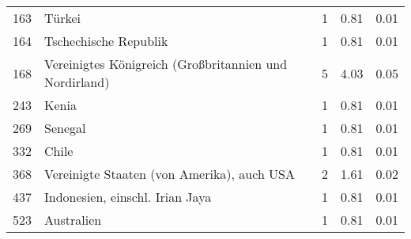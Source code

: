 \begin{longtable}{lXrrr}
        163 & \multicolumn{1}{X}{Türkei} & %
          \num{1} &
          \num[round-mode=places,round-precision=2]{0,81} &
          \num[round-mode=places,round-precision=2]{0,01} \\

        164 & \multicolumn{1}{X}{Tschechische Republik} & %
          \num{1} &
          \num[round-mode=places,round-precision=2]{0,81} &
          \num[round-mode=places,round-precision=2]{0,01} \\

        168 & \multicolumn{1}{X}{Vereinigtes Königreich (Großbritannien und Nordirland)} & %
          \num{5} &
          \num[round-mode=places,round-precision=2]{4,03} &
          \num[round-mode=places,round-precision=2]{0,05} \\

        243 & \multicolumn{1}{X}{Kenia} & %
          \num{1} &
          \num[round-mode=places,round-precision=2]{0,81} &
          \num[round-mode=places,round-precision=2]{0,01} \\

        269 & \multicolumn{1}{X}{Senegal} & %
          \num{1} &
          \num[round-mode=places,round-precision=2]{0,81} &
          \num[round-mode=places,round-precision=2]{0,01} \\

        332 & \multicolumn{1}{X}{Chile} & %
          \num{1} &
          \num[round-mode=places,round-precision=2]{0,81} &
          \num[round-mode=places,round-precision=2]{0,01} \\

        368 & \multicolumn{1}{X}{Vereinigte Staaten (von Amerika), auch USA} & %
          \num{2} &
          \num[round-mode=places,round-precision=2]{1,61} &
          \num[round-mode=places,round-precision=2]{0,02} \\

        437 & \multicolumn{1}{X}{Indonesien, einschl. Irian Jaya} & %
          \num{1} &
          \num[round-mode=places,round-precision=2]{0,81} &
          \num[round-mode=places,round-precision=2]{0,01} \\

        523 & \multicolumn{1}{X}{Australien} & %
          \num{1} &
          \num[round-mode=places,round-precision=2]{0,81} &
          \num[round-mode=places,round-precision=2]{0,01} \\


\end{longtable}
